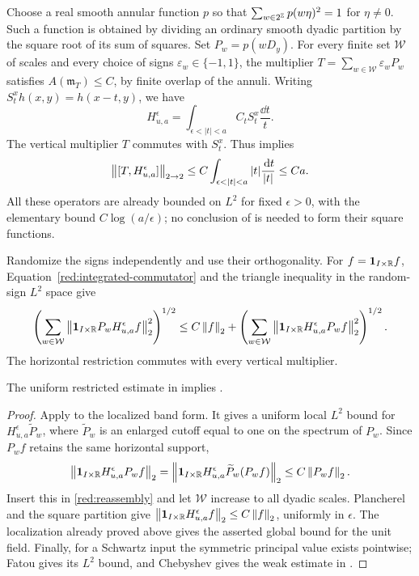 Choose a real smooth annular function \(p\) so that
\(\sum_{w\in2^{\mathbb Z}}p(w\eta)^2=1\) for \(\eta\ne0\).
Such a function is obtained by dividing an ordinary smooth dyadic
partition by the square root of its sum of squares. Set
\(P_w=p(wD_y)\). For every finite set \(\mathcal W\) of scales and
every choice of signs \(\varepsilon_w\in\{-1,1\}\), the multiplier
\(T=\sum_{w\in\mathcal W}\varepsilon_wP_w\) satisfies
\(A(\mathfrak m_T)\le C\), by finite overlap of the annuli.
Writing \(S_t^x h(x,y)=h(x-t,y)\), we have
\[
 H_{u,a}^{\epsilon}
      =\int_{\epsilon<|t|<a} C_t S_t^x\frac{\dd t}{t}.
\]
The vertical multiplier \(T\) commutes with \(S_t^x\). Thus
 implies
\begin{equation}\label{red:integrated-commutator}
 \norm{[T,H_{u,a}^{\epsilon}]}_{2\to2}
       \le C\int_{\epsilon<|t|<a}|t|\frac{\dd t}{|t|}
       \le C a.
\end{equation}
All these operators are already bounded on \(L^2\) for fixed
\(\epsilon>0\), with the elementary bound
\(C\log(a/\epsilon)\); no conclusion of
 is needed to form their square functions.

Randomize the signs independently and use their orthogonality.
For \(f=\mathbf 1_{I\times\mathbb R}f\), Equation~\eqref{red:integrated-commutator}
and the triangle inequality in the random-sign \(L^2\) space give
\begin{equation}\label{red:reassembly}
 \left(\sum_{w\in\mathcal W}
       \left\|\mathbf 1_{I\times\mathbb R}P_w H_{u,a}^{\epsilon}f\right\|_2^2
       \right)^{1/2}
 \le C\left\|f\right\|_2+
 \left(\sum_{w\in\mathcal W}
       \left\|\mathbf 1_{I\times\mathbb R}H_{u,a}^{\epsilon}P_w f\right\|_2^2
       \right)^{1/2}.
\end{equation}
The horizontal restriction commutes with every vertical multiplier.

\begin{proposition}\label{red:band-implies-main}
The uniform restricted estimate in  implies
.
\end{proposition}

\begin{proof}
Apply  to the localized band form.
It gives a uniform local \(L^2\) bound for
\(H_{u,a}^{\epsilon}\widetilde P_w\), where
\(\widetilde P_w\) is an enlarged cutoff equal to one on the
spectrum of \(P_w\). Since \(P_w f\) retains the same horizontal
support,
\[
 \left\|\mathbf 1_{I\times\mathbb R}H_{u,a}^{\epsilon}P_w f\right\|_2
 =\left\|\mathbf 1_{I\times\mathbb R}H_{u,a}^{\epsilon}
                      \widetilde P_w(P_w f)\right\|_2
 \le C\left\|P_w f\right\|_2.
\]
Insert this in \eqref{red:reassembly} and let \(\mathcal W\)
increase to all dyadic scales. Plancherel and the square partition
give
\(\left\|\mathbf 1_{I\times\mathbb R}H_{u,a}^{\epsilon}f\right\|_2
\le C\left\|f\right\|_2\), uniformly in \(\epsilon\). The localization
already proved above gives the asserted global bound for the unit
field. Finally, for a Schwartz input the symmetric principal value
exists pointwise; Fatou gives its \(L^2\) bound, and Chebyshev gives
the weak estimate in .
\end{proof}

